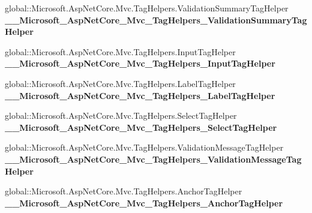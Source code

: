 \begin{DoxyCompactItemize}
\item 
\mbox{\label{class_asp_net_core_1_1_views___items___edit_ad3e92f352901578448fa899f0ce663b9}} 
global\+::\+Microsoft.\+Asp\+Net\+Core.\+Mvc.\+Tag\+Helpers.\+Validation\+Summary\+Tag\+Helper {\bfseries \+\_\+\+\_\+\+Microsoft\+\_\+\+Asp\+Net\+Core\+\_\+\+Mvc\+\_\+\+Tag\+Helpers\+\_\+\+Validation\+Summary\+Tag\+Helper}
\item 
\mbox{\label{class_asp_net_core_1_1_views___items___edit_a84e37f4eb1f19ac6d0f30cb98b8664c6}} 
global\+::\+Microsoft.\+Asp\+Net\+Core.\+Mvc.\+Tag\+Helpers.\+Input\+Tag\+Helper {\bfseries \+\_\+\+\_\+\+Microsoft\+\_\+\+Asp\+Net\+Core\+\_\+\+Mvc\+\_\+\+Tag\+Helpers\+\_\+\+Input\+Tag\+Helper}
\item 
\mbox{\label{class_asp_net_core_1_1_views___items___edit_af0d6cb132cde8217b711f8ae953911ef}} 
global\+::\+Microsoft.\+Asp\+Net\+Core.\+Mvc.\+Tag\+Helpers.\+Label\+Tag\+Helper {\bfseries \+\_\+\+\_\+\+Microsoft\+\_\+\+Asp\+Net\+Core\+\_\+\+Mvc\+\_\+\+Tag\+Helpers\+\_\+\+Label\+Tag\+Helper}
\item 
\mbox{\label{class_asp_net_core_1_1_views___items___edit_a057359b7ecae2a98f99b86c486d41b05}} 
global\+::\+Microsoft.\+Asp\+Net\+Core.\+Mvc.\+Tag\+Helpers.\+Select\+Tag\+Helper {\bfseries \+\_\+\+\_\+\+Microsoft\+\_\+\+Asp\+Net\+Core\+\_\+\+Mvc\+\_\+\+Tag\+Helpers\+\_\+\+Select\+Tag\+Helper}
\item 
\mbox{\label{class_asp_net_core_1_1_views___items___edit_a769af1fafaf3f53dee8a7cc3a65e6984}} 
global\+::\+Microsoft.\+Asp\+Net\+Core.\+Mvc.\+Tag\+Helpers.\+Validation\+Message\+Tag\+Helper {\bfseries \+\_\+\+\_\+\+Microsoft\+\_\+\+Asp\+Net\+Core\+\_\+\+Mvc\+\_\+\+Tag\+Helpers\+\_\+\+Validation\+Message\+Tag\+Helper}
\item 
\mbox{\label{class_asp_net_core_1_1_views___items___edit_a5a8c209668718c0c660b9612a199b5be}} 
global\+::\+Microsoft.\+Asp\+Net\+Core.\+Mvc.\+Tag\+Helpers.\+Anchor\+Tag\+Helper {\bfseries \+\_\+\+\_\+\+Microsoft\+\_\+\+Asp\+Net\+Core\+\_\+\+Mvc\+\_\+\+Tag\+Helpers\+\_\+\+Anchor\+Tag\+Helper}
\end{DoxyCompactItemize}
